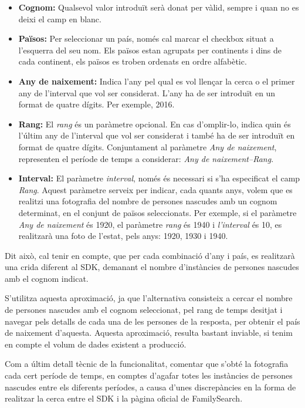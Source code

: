     \begin{itemize}
        \item \textbf{Cognom:} Qualsevol valor introduït serà donat per vàlid, sempre i quan no es deixi el camp en blanc.
        \item \textbf{Països:} Per seleccionar un país, només cal marcar el checkbox situat a l’esque\-rra del seu nom. Els països estan agrupats per continents i dins de cada continent, els països es troben ordenats en ordre alfabètic.
        \item \textbf{Any de naixement:} Indica l'any pel qual es vol llençar la cerca o el primer any de l’interval que vol ser considerat. L'any ha de ser introduït en un format de quatre dígits. Per exemple, 2016.
        \item \textbf{Rang:} El \emph{rang} és un paràmetre opcional. En cas d’omplir-lo, indica quin és l'últim any de l’interval que vol ser considerat i també ha de ser introduït en format de quatre dígits. Conjuntament al paràmetre \emph{Any de naixement}, representen el període de temps a considerar: \emph{Any de naixement--Rang}.
        \item \textbf{Interval:} El paràmetre \emph{interval}, només és necessari si s'ha especificat el camp \emph{Rang}. Aquest paràmetre serveix per indicar, cada quants anys, volem que es realitzi una fotografia del nombre de persones nascudes amb un cognom determinat, en el conjunt de països seleccionats. Per exemple, si el paràmetre \emph{Any de naixement} és 1920, el paràmetre \emph{rang} és 1940 i \emph{l’interval} és 10, es realitzarà una foto de l'estat, pels anys: 1920, 1930 i 1940.
    \end{itemize}

    Dit això, cal tenir en compte, que per cada combinació d'any i país, es realitzarà una crida diferent al SDK, demanant el nombre d'instàncies de persones nascudes amb el cognom indicat.

    S'utilitza aquesta aproximació, ja que l'alternativa consisteix a cercar el nombre de persones nascudes amb el cognom seleccionat, pel rang de temps desitjat i navegar pels detalls de cada una de les persones de la resposta, per obtenir el país de naixement d’aquesta. Aquesta aproximació, resulta bastant inviable, si tenim en compte el volum de dades existent a producció.

    Com a últim detall tècnic de la funcionalitat, comentar que s'obté la fotografia cada cert període de temps, en comptes d'agafar totes les instàncies de persones nascudes entre els diferents períodes, a causa d’unes discrepàncies en la forma de realitzar la cerca entre el SDK i la pàgina oficial de FamilySearch.

